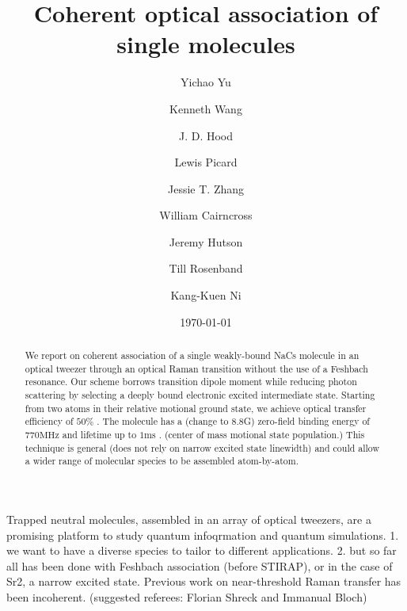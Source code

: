 \documentclass[aps,prl,twocolumn,groupedaddress]{revtex4-1}
\newcommand{\todo}[1]{}
\begin{document}
\title{Coherent optical association of single molecules}
\author{Yichao Yu}
\author{Kenneth Wang}
\author{J. D. Hood}
\author{Lewis Picard}
\author{Jessie T. Zhang}
\author{William Cairncross}
\author{Jeremy Hutson}
\author{Till Rosenband}
\author{Kang-Kuen Ni}

\date{\today}

\begin{abstract}
  We report on coherent association of a single weakly-bound NaCs molecule in an optical tweezer
  through an optical Raman transition without the use of a Feshbach resonance. Our scheme borrows transition dipole moment while reducing photon scattering by selecting a deeply bound electronic excited intermediate state.
  Starting from two atoms in their relative motional ground state,
  we achieve optical transfer efficiency of $50 \%$ \todo{number}.
  The molecule has a (change to 8.8G) zero-field binding energy of $770 \mathrm{MHz}$ \todo{number}
  and lifetime up to $1 \mathrm{ms}$ \todo{number}. (center of mass motional state population.)
  This  technique is general (does not rely on narrow excited state linewidth) and could allow a wider range of molecular species to be assembled atom-by-atom.
\end{abstract}


\maketitle


Trapped neutral molecules, assembled in an array of optical tweezers, are a promising platform to study quantum infoqrmation and quantum simulations.
1. we want to have a diverse species to tailor to different applications. 2. but so far all has been done with Feshbach association (before STIRAP), or in the case of Sr2, a narrow excited state. Previous work on near-threshold Raman transfer has been incoherent. (suggested referees: Florian Shreck and Immanual Bloch)
\end{document}
